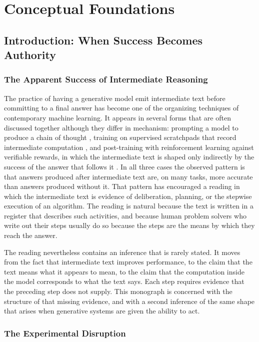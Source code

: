 \part{Conceptual Foundations}
\label{part:foundations}

\chapter{Introduction: When Success Becomes Authority}
\label{ch:intro}

\section{The Apparent Success of Intermediate Reasoning}

The practice of having a generative model emit intermediate text before committing to a final answer has become one of the organizing techniques of contemporary machine learning. It appears in several forms that are often discussed together although they differ in mechanism: prompting a model to produce a chain of thought \cite{wei2022}, training on supervised scratchpads that record intermediate computation \cite{nye2021}, and post-training with reinforcement learning against verifiable rewards, in which the intermediate text is shaped only indirectly by the success of the answer that follows it \cite{shao2024}. In all three cases the observed pattern is that answers produced after intermediate text are, on many tasks, more accurate than answers produced without it. That pattern has encouraged a reading in which the intermediate text is evidence of deliberation, planning, or the stepwise execution of an algorithm. The reading is natural because the text is written in a register that describes such activities, and because human problem solvers who write out their steps usually do so because the steps are the means by which they reach the answer.

The reading nevertheless contains an inference that is rarely stated. It moves from the fact that intermediate text improves performance, to the claim that the text means what it appears to mean, to the claim that the computation inside the model corresponds to what the text says. Each step requires evidence that the preceding step does not supply. This monograph is concerned with the structure of that missing evidence, and with a second inference of the same shape that arises when generative systems are given the ability to act.

\section{The Experimental Disruption}

